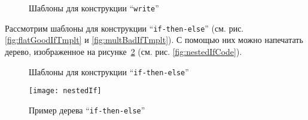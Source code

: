 \begin{figure}[h!]
	\null\hfill
	\subfloat[]{
		
		\label{fig:writeTmplt1}	
	}
	\hfill
	\subfloat[]{
		
		\label{fig:writeTmplt2}
	}
	\hfill
	\null

	\caption{Шаблоны для конструкции “\lstinline{write}”}
\end{figure}

Рассмотрим шаблоны для конструкции “\lstinline{if-then-else}” (см. рис. \ref{fig:flatGoodIfTmplt} и \ref{fig:multBadIfTmplt}).
С помощью них можно напечатать дерево, изображенное на рисунке~\ref{fig:nestedIf} (см. рис. \ref{fig:nestedIfCode}).

\begin{figure}[h!]
	\hfill
	
	
	\caption{Шаблоны для конструкции “\lstinline{if-then-else}”}
	\label{fig:ifTmplt}
\end{figure}

\begin{figure}[h!]
	\centering
	\texttt{[image: nestedIf]}
	\caption{Пример дерева “\lstinline{if-then-else}”}
	\label{fig:nestedIf}
\end{figure}


